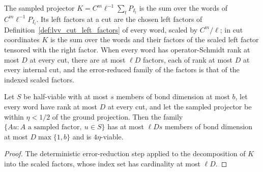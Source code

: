 \begin{definition}
    \label{def:lvv_sampled_factors}
    \leanok
    The sampled projector $K=C^m\ell^{-1}\sum_t P_{I_t}$ is the sum over the
    words of $C^m\ell^{-1}P_{I_t}$. Its left factors at a cut are the chosen
    left factors of Definition~\ref{def:lvv_cut_left_factors} of every word,
    scaled by $C^m/\ell$; in cut coordinates $K$ is the sum over the words and
    their factors of the scaled left factor tensored with the right factor.
    When every word has operator-Schmidt rank at most $D$ at every cut, there
    are at most $\ell D$ factors, each of rank at most $D$ at every internal
    cut, and the error-reduced family of the factors is that of the indexed
    scaled factors.
\end{definition}

\begin{lemma}
    \label{thm:lvv_sampled_factors_viable}
    \leanok
    Let $S$ be half-viable with at most $s$ members of bond dimension at most
    $b$, let every word have rank at most $D$ at every cut, and let the sampled
    projector be within $\eta<1/2$ of the ground projection. Then the family
    $\{Au: A \text{ a sampled factor},\ u\in S\}$ has at most $\ell Ds$ members
    of bond dimension at most $D\max\{1,b\}$ and is $4\eta$-viable.
\end{lemma}
\begin{proof}
    \leanok
    The deterministic error-reduction step applied to the decomposition of $K$
    into the scaled factors, whose index set has cardinality at most $\ell D$.
\end{proof}


